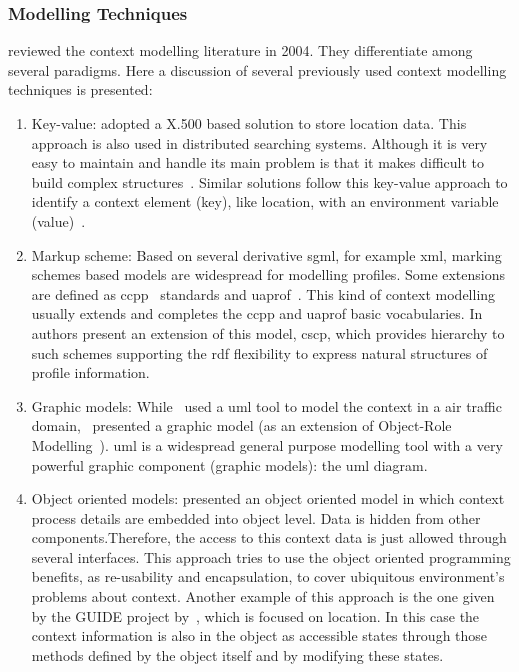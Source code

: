 
\subsubsection{Modelling Techniques}
\label{sec:modelling_techniques}

\citet{strang_context_2004} reviewed the context modelling literature in 2004.
They differentiate among several paradigms. Here a discussion of several 
previously used context modelling techniques is presented:

\begin{enumerate}
  \item Key-value: \citet{maass_location_aware_1998} adopted a X.500 based 
  solution to store location data. This approach is also used in distributed 
  searching systems. Although it is very easy to maintain and handle its main 
  problem is that it makes difficult to build complex structures~\citep{strang_context_2004}. 
  Similar solutions follow this key-value approach to identify a context element 
  (key), like location, with an environment variable (value)~\citep{schilit_customizing_1993}\citep{voelker_mobisaic_1996}. 
  
  \item Markup scheme: Based on several derivative \ac{sgml}, for example 
  \ac{xml}, marking schemes based models are widespread for modelling profiles. 
  Some extensions are defined as \ac{ccpp}~\citep{ccpp} standards and
  \ac{uaprof}~\citep{uaprof}. This kind of context modelling usually extends and
  completes the \ac{ccpp} and \ac{uaprof} basic vocabularies.
  In~\citep{held_modeling_2002} authors present an extension of this model,
  \ac{cscp}, which provides hierarchy to such schemes supporting the \ac{rdf}
  flexibility to express natural structures of profile information.
  
  \item Graphic models: While~\citet{bauer_identification_2003} used a \ac{uml} 
  tool to model the context in a air traffic domain,~\citet{henricksen_generating_2003} 
  presented a graphic model (as an extension of Object-Role Modelling~\citep{orm}). 
  \ac{uml} is a widespread general purpose modelling tool with a very powerful 
  graphic component (graphic models): the \ac{uml} diagram. 
  
  \item Object oriented models: \citet{strang_context_2004} presented an object 
  oriented model in which context process details are embedded into object level. 
  Data is hidden from other components.Therefore, the access to this context data 
  is just allowed through several interfaces. This approach tries to use the 
  object oriented programming benefits, as re-usability and encapsulation, to 
  cover ubiquitous environment's problems about context. Another example of this 
  approach is the one given by the GUIDE project by~\citet{cheverst_design_1999}, 
  which is focused on location. In this case the context information is also in 
  the object as accessible states through those methods defined by the object 
  itself and by modifying these states.
  

\end{enumerate}
